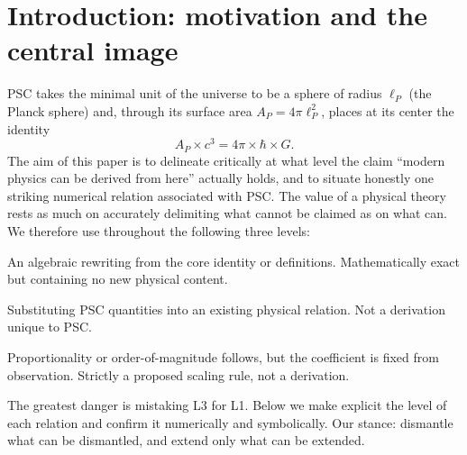 \documentclass[11pt,a4paper]{article}
\newcommand{\eP}{\ell_P}
\begin{document}
\section{Introduction: motivation and the central image}
PSC takes the minimal unit of the universe to be a sphere of radius $\eP$ (the Planck sphere) and, through its surface area $A_P = 4\pi\eP^2$, places at its center the identity
\begin{equation}
A_P \times c^3 = 4\pi \times \hbar \times G.
\label{eq:core}
\end{equation}
The aim of this paper is to delineate critically at what level the claim ``modern physics can be derived from here'' actually holds, and to situate honestly one striking numerical relation associated with PSC. The value of a physical theory rests as much on accurately delimiting what cannot be claimed as on what can. We therefore use throughout the following three levels:
\begin{description}[leftmargin=2.2em,style=nextline]
\item[L1 (identity transformation)] An algebraic rewriting from the core identity or definitions. Mathematically exact but containing no new physical content.
\item[L2 (substitution into an existing formula)] Substituting PSC quantities into an existing physical relation. Not a derivation unique to PSC.
\item[L3 (dimensional analysis with a fitted coefficient)] Proportionality or order-of-magnitude follows, but the coefficient is fixed from observation. Strictly a proposed scaling rule, not a derivation.
\end{description}
The greatest danger is mistaking L3 for L1. Below we make explicit the level of each relation and confirm it numerically and symbolically. Our stance: dismantle what can be dismantled, and extend only what can be extended.
\end{document}
